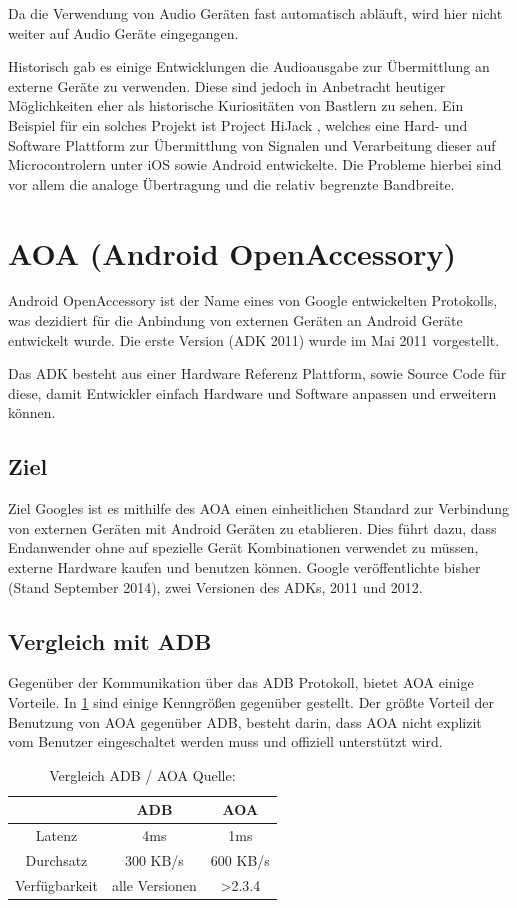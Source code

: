 \documentclass[12pt,journal,compsoc]{IEEEtran}
\begin{document}
Da die Verwendung von Audio Geräten fast automatisch abläuft, wird hier nicht weiter auf Audio Geräte eingegangen.

Historisch gab es einige Entwicklungen die Audioausgabe zur Übermittlung an externe Geräte zu verwenden. Diese sind jedoch in Anbetracht heutiger Möglichkeiten eher als historische Kuriositäten von Bastlern zu sehen.
Ein Beispiel für ein solches Projekt ist Project HiJack \cite{hijack} , welches eine Hard- und Software Plattform zur Übermittlung von Signalen und Verarbeitung dieser auf Microcontrolern unter iOS sowie Android entwickelte.
Die Probleme hierbei sind vor allem die analoge Übertragung und die relativ begrenzte Bandbreite.


\section{AOA (Android OpenAccessory)}
Android OpenAccessory ist der Name eines von Google entwickelten Protokolls, was 
dezidiert für die Anbindung von externen Geräten an Android Geräte entwickelt wurde.
Die erste Version (ADK 2011) wurde im Mai 2011 vorgestellt.

Das ADK besteht aus einer Hardware Referenz Plattform, sowie Source Code für diese, damit 
Entwickler einfach Hardware und Software anpassen und erweitern können.
\cite{developaoa}
\subsection{Ziel}
Ziel Googles ist es mithilfe des AOA einen einheitlichen Standard zur Verbindung von externen Geräten mit Android Geräten zu etablieren.
Dies führt dazu, dass Endanwender ohne auf spezielle Gerät Kombinationen verwendet zu müssen, externe Hardware kaufen und benutzen können.
Google veröffentlichte bisher (Stand September 2014), zwei Versionen des ADKs, 2011 und 2012. 

\subsection{Vergleich mit ADB}
Gegenüber der Kommunikation über das ADB Protokoll, bietet AOA einige Vorteile. In \ref{table:vergl} sind einige Kenngrößen gegenüber gestellt. Der größte Vorteil der Benutzung von AOA gegenüber ADB, besteht darin, dass AOA nicht explizit vom Benutzer eingeschaltet werden muss und offiziell unterstützt wird.


\begin{table}
	\centering
	\caption{Vergleich ADB / AOA Quelle: \cite{comp}}
	\label{table:vergl}
	\begin{tabular}{c | c | c}
		& ADB & AOA \\ \hline
		Latenz & 4ms & 1ms \\ \hline
		Durchsatz & 300 KB/s & 600 KB/s \\ \hline
		Verfügbarkeit & alle Versionen & \textgreater 2.3.4 \\ \hline
	\end{tabular}
\end{table}
\end{document}

